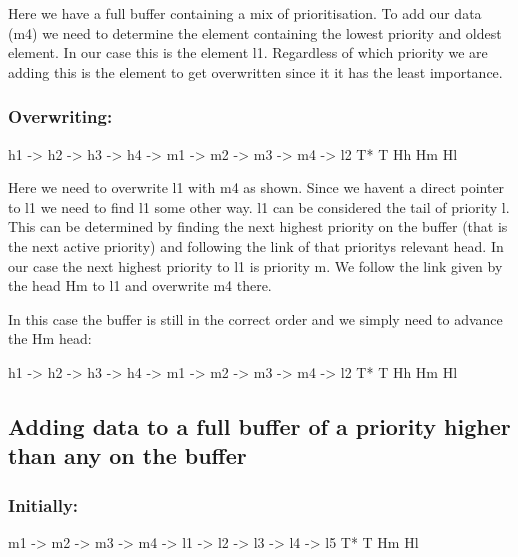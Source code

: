 Here we have a full buffer containing a mix of prioritisation. To add our data (m4) we need to determine the element containing the lowest priority and oldest element. In our case this is the element l1. Regardless of which priority we are adding this is the element to get overwritten since it it has the least importance.

\subsubsection*{Overwriting\+:}


\begin{DoxyCode}
h1  ->  h2  ->  h3  ->  h4  ->   m1  ->  m2  ->  m3  ->  m4  ->  l2
T*                                                               T
                        Hh                       Hm              Hl
\end{DoxyCode}


Here we need to overwrite l1 with m4 as shown. Since we haven\textquotesingle{}t a direct pointer to l1 we need to find l1 some other way. l1 can be considered the \textquotesingle{}tail\textquotesingle{} of priority \textquotesingle{}l\textquotesingle{}. This can be determined by finding the next highest priority on the buffer (that is the next active priority) and following the link of that priority\textquotesingle{}s relevant head. In our case the next highest priority to l1 is priority m. We follow the link given by the head Hm to l1 and overwrite m4 there.

In this case the buffer is still in the correct order and we simply need to advance the Hm head\+:


\begin{DoxyCode}
h1  ->  h2  ->  h3  ->  h4  ->   m1  ->  m2  ->  m3  ->  m4  ->  l2
T*                                                               T
                        Hh                               Hm      Hl
\end{DoxyCode}


\subsection*{Adding data to a full buffer of a priority higher than any on the buffer}

\subsubsection*{Initially\+:}


\begin{DoxyCode}
m1  ->  m2  ->  m3  ->  m4  ->  l1  ->  l2  ->  l3  ->  l4  ->   l5
T*                                                               T
                        Hm                                       Hl
\end{DoxyCode}


